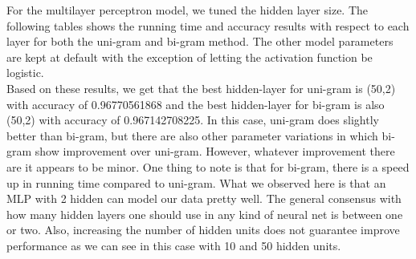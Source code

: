 For the multilayer perceptron model, we tuned the hidden layer size. The following tables shows the running time and accuracy results with respect to each layer for both the uni-gram and bi-gram method. The other model parameters are kept at default with the exception of letting the activation function be logistic. \\

Based on these results, we get that the best hidden-layer for uni-gram is (50,2) with accuracy of 0.96770561868 and the best hidden-layer for bi-gram is also (50,2) with accuracy of 0.967142708225. In this case, uni-gram does slightly better than bi-gram, but there are also other parameter variations in which bi-gram show improvement over uni-gram. However, whatever improvement there are it appears to be minor. One thing to note is that for bi-gram, there is a speed up in running time compared to  uni-gram. What we observed here is that an MLP with 2 hidden can model our data pretty well. The general consensus with how many hidden layers one should use in any kind of neural net is between one or two. Also, increasing the number of hidden units does not guarantee improve performance as we can see in this case with 10 and 50 hidden units. \\

